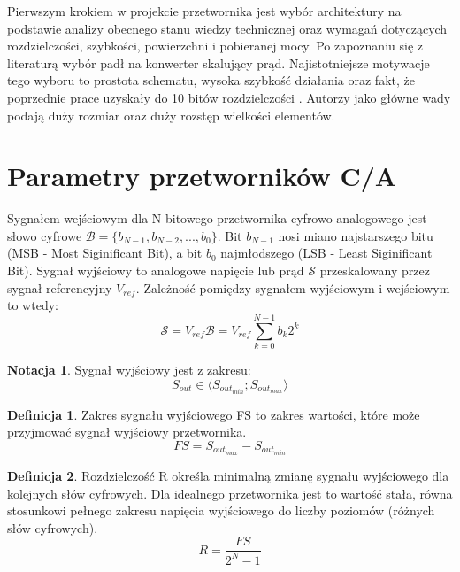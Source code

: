 \documentclass[10pt,a4paper,twoside]{report}
\theoremstyle{definition}
\newtheorem{notation}{Notacja}[section]
\theoremstyle{definition}
\newtheorem{definition}{Definicja}[section]
\theoremstyle{definition}
\theoremstyle{definition}
\theoremstyle{definition}
\begin{document}
	{	Pierwszym krokiem w projekcie przetwornika jest wybór architektury na podstawie analizy obecnego stanu wiedzy technicznej oraz wymagań dotyczących rozdzielczości, szybkości, powierzchni i pobieranej mocy. Po zapoznaniu się z literaturą wybór padł na konwerter skalujący prąd. Najistotniejsze motywacje tego wyboru to prostota schematu, wysoka szybkość działania \cite{cmosanal} oraz fakt, że poprzednie prace uzyskały do 10 bitów rozdzielczości \cite{plassche}.	Autorzy \cite{cmosanal} jako główne wady podają duży rozmiar oraz duży rozstęp wielkości elementów.}
	
	\section{Parametry przetworników C/A}
	{	Sygnałem wejściowym dla N bitowego przetwornika cyfrowo analogowego jest słowo cyfrowe $\mathcal{B}=\{b_{N-1},b_{N-2},...,b_0\}$. Bit $b_{N-1}$ nosi miano najstarszego bitu (MSB - Most Siginificant Bit), a bit $b_0$ najmłodszego (LSB - Least Siginificant Bit). Sygnał wyjściowy to analogowe napięcie lub prąd $\mathcal{S}$ przeskalowany przez sygnał referencyjny $V_{ref}$. Zależność pomiędzy sygnałem wyjściowym i wejściowym to wtedy:
		\begin{equation}
		\mathcal{S} = V_{ref}\mathcal{B} = V_{ref} {\sum_{k=0}^{N-1} b_k2^k}
		\end{equation}	}
	
	\begin{notation}{Sygnał wyjściowy jest z zakresu:}
		$$
		S_{out} \in \langle S_{out_{min}} ;  S_{out_{max}} \rangle
		$$
	\end{notation}
	
	\begin{definition}{Zakres sygnału wyjściowego FS to zakres wartości, które może przyjmować sygnał wyjściowy przetwornika.}
		\begin{equation}
		FS = S_{out_{max}} - S_{out_{min}}
		\end{equation}
	\end{definition}
	
	\begin{definition}{Rozdzielczość R określa minimalną zmianę sygnału wyjściowego dla kolejnych słów cyfrowych. Dla idealnego przetwornika jest to wartość stała, równa stosunkowi pełnego zakresu napięcia wyjściowego do liczby poziomów (różnych słów cyfrowych). }
		\begin{equation}
		R = \frac{FS}{2^{N}-1}		
		\end{equation}
	\end{definition}
	
\end{document}
